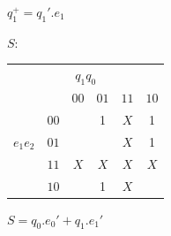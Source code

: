 \documentclass[11pt]{article}
\begin{document}
\begin{multicols}{2}
$q_1^+ = q_1'. e_1$

$S$: 
\begin{tabular}{|cc|c|c|c|c|}
\hline
\multicolumn{6}{|c|}{$q_1 q_0 $ } \\
           & & \tiny{$00$} & \tiny{$01$}  & \tiny{$11$}  & \tiny{$10$}  \\
           & \tiny{$00$} &   & 1 & $X$ & 1 \\
$e_1 e_2$  & \tiny{$01$} &   &   & $X$ & 1 \\
           & \tiny{$11$} & $X$ & $X$ & $X$ & $X$ \\
           & \tiny{$10$} &   & 1 & $X$ &   \\
\hline
\end{tabular}

$ S = q_0. e_0' + q_1. e_1' $


\vspace{10pt}

\end{multicols}

\end{document}

